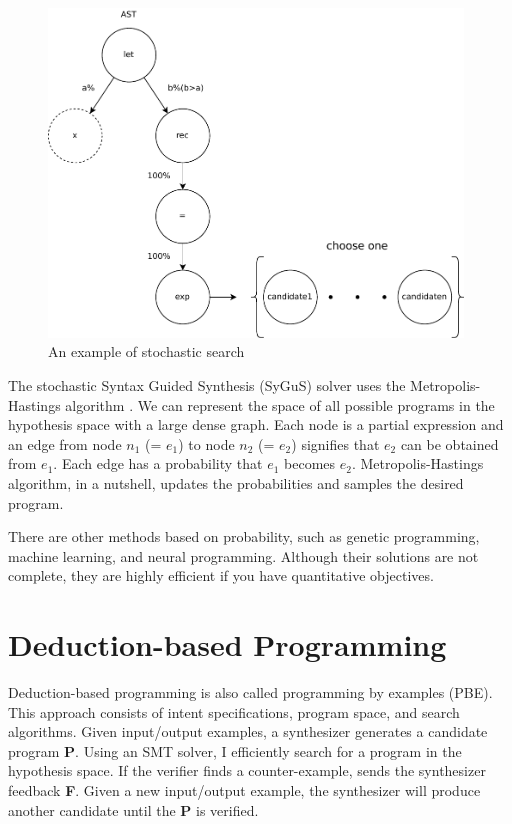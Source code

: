 \documentclass[12pt, a4paper, titlepage]{report}
\begin{document}
    \begin{figure}[htbp]
      \centering
      \includegraphics[width=11cm]{images/stochastic.pdf}
      \caption{An example of stochastic search}
      \label{stochastic}
    \end{figure}

    The stochastic Syntax Guided Synthesis (SyGuS) solver uses the Metropolis-Hastings algorithm \cite{alur:2013}.
    We can represent the space of all possible programs in the hypothesis space with a large dense graph.
    Each node is a partial expression and an edge from node $n_1$ (= $e_1$) to node $n_2$ (= $e_2$) signifies that $e_2$ can be obtained from $e_1$.
    Each edge has a probability that $e_1$ becomes $e_2$.
    Metropolis-Hastings algorithm, in a nutshell, updates the probabilities and samples the desired program.

    There are other methods based on probability, such as genetic programming, machine learning, and neural programming.
    Although their solutions are not complete, they are highly efficient if you have quantitative objectives.

  \section{Deduction-based Programming}
    Deduction-based programming is also called programming by examples (PBE).
    This approach consists of intent specifications, program space, and search algorithms.
    Given input/output examples, a synthesizer generates a candidate program \textbf{P}.
    Using an SMT solver, I efficiently search for a program in the hypothesis space.
    If the verifier finds a counter-example, sends the synthesizer feedback \textbf{F}.
    Given a new input/output example, the synthesizer will produce another candidate until the \textbf{P} is verified.
\end{document}
